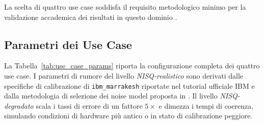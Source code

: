 \begin{onehalfspace}
La scelta di quattro use case soddisfa il requisito metodologico minimo per la validazione accademica dei risultati in questo dominio \cite{shor_hpec2023}.

\subsection{Parametri dei Use Case}

La Tabella~\ref{tab:use_case_params} riporta la configurazione completa dei quattro use case. I parametri di rumore del livello \textit{NISQ-realistico} sono derivati dalle specifiche di calibrazione di \texttt{ibm\_marrakesh} riportate nel tutorial ufficiale IBM \cite{ibm_shor_tutorial} e dalla metodologia di selezione dei noise model proposta in \cite{epjqt_noise2024}. Il livello \textit{NISQ-degradato} scala i tassi di errore di un fattore $5\times$ e dimezza i tempi di coerenza, simulando condizioni di hardware più antico o in stato di calibrazione peggiore.

\begin{table}[H]
\centering
{}
\caption{Configurazione completa dei quattro use case. I parametri di rumore del livello NISQ-realistico sono derivati dalle specifiche di \texttt{ibm\_marrakesh} \cite{ibm_shor_tutorial, epjqt_noise2024}. Il livello NISQ-degradato scala i tassi di errore di $5\times$ e dimezza $T_1$ e $T_2$.}
\label{tab:use_case_params}
\end{table}


\end{onehalfspace}
